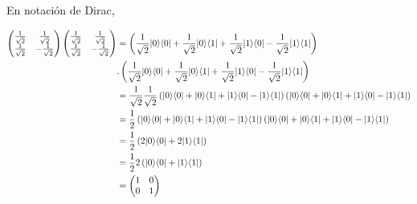 \documentclass[osajnl,preprint,showpacs,superscriptaddress,10pt]{revtex4-1} %
\DeclarePairedDelimiter\bra{\langle}{\rvert}
\DeclarePairedDelimiter\ket{\lvert}{\rangle}
\begin{document}
\begin{itemize}
    En notación de Dirac,
    \begin{fleqn}[\parindent]
    \begin{equation}
    \begin{split}
        \begin{pmatrix}\frac{1}{\sqrt{2}} & \frac{1}{\sqrt{2}} \\ \frac{1}{\sqrt{2}} & -\frac{1}{\sqrt{2}}\end{pmatrix}\begin{pmatrix}\frac{1}{\sqrt{2}} & \frac{1}{\sqrt{2}} \\ \frac{1}{\sqrt{2}} & -\frac{1}{\sqrt{2}}\end{pmatrix}
            &= \left (\frac{1}{\sqrt{2}}\ket{0}\bra{0} + \frac{1}{\sqrt{2}}\ket{0}\bra{1} + \frac{1}{\sqrt{2}}\ket{1}\bra{0} -\frac{1}{\sqrt{2}}\ket{1}\bra{1} \right) \\
            &. \left (\frac{1}{\sqrt{2}}\ket{0}\bra{0} + \frac{1}{\sqrt{2}}\ket{0}\bra{1} + \frac{1}{\sqrt{2}}\ket{1}\bra{0} -\frac{1}{\sqrt{2}}\ket{1}\bra{1} \right) \\
            &= \frac{1}{\sqrt{2}}\frac{1}{\sqrt{2}} \left (\ket{0}\bra{0} + \ket{0}\bra{1} + \ket{1}\bra{0} -\ket{1}\bra{1} \right) \left (\ket{0}\bra{0} + \ket{0}\bra{1} + \ket{1}\bra{0} -\ket{1}\bra{1} \right) \\
            &= \frac{1}{2} \left (\ket{0}\bra{0} + \ket{0}\bra{1} + \ket{1}\bra{0} -\ket{1}\bra{1} \right) \left (\ket{0}\bra{0} + \ket{0}\bra{1} + \ket{1}\bra{0} -\ket{1}\bra{1} \right) \\
            &= \frac{1}{2} \left (2\ket{0}\bra{0} + 2\ket{1}\bra{1} \right) \\
            &= \frac{1}{2} 2 \left (\ket{0}\bra{0} + \ket{1}\bra{1} \right) \\
            &= \begin{pmatrix}1 & 0\\ 0 & 1\end{pmatrix}
    \end{split}
    \end{equation}
    \end{fleqn}
\end{itemize}
\end{document}
